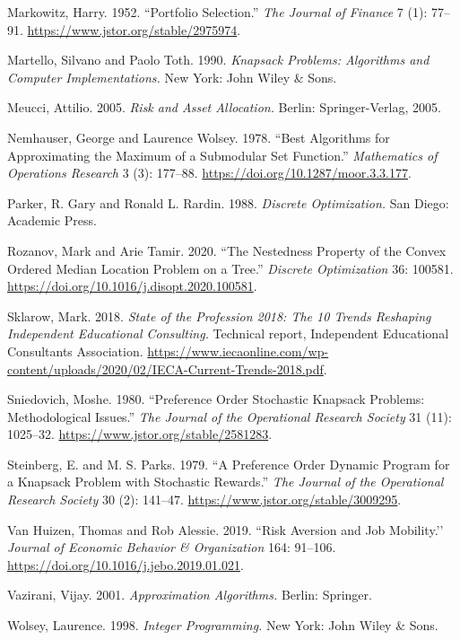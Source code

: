 \documentclass[11pt]{article} %
\theoremstyle{definition}
\theoremstyle{definition}
\begin{document}
Markowitz, Harry. 1952. ``Portfolio Selection.'' \emph{The Journal of Finance} 7 (1): 77--91. \url{https://www.jstor.org/stable/2975974}.

Martello, Silvano and Paolo Toth. 1990. \emph{Knapsack Problems: Algorithms and Computer Implementations.} New York: John Wiley \& Sons. 

Meucci, Attilio. 2005. \emph{Risk and Asset Allocation.} Berlin: Springer-Verlag, 2005. 

Nemhauser, George and Laurence Wolsey. 1978. ``Best Algorithms for Approximating the Maximum of a Submodular Set Function.'' \emph{Mathematics of Operations Research} 3 (3): 177--88. \url{https://doi.org/10.1287/moor.3.3.177}.


Parker, R. Gary and Ronald L. Rardin. 1988. \emph{Discrete Optimization.} San Diego: Academic Press.

Rozanov, Mark and Arie Tamir. 2020. ``The Nestedness Property of the Convex Ordered Median Location Problem on a Tree.'' \emph{Discrete Optimization} 36: 100581. \url{https://doi.org/10.1016/j.disopt.2020.100581}.

Sklarow, Mark. 2018. \emph{State of the Profession 2018: The 10 Trends Reshaping Independent Educational Consulting.} Technical report, Independent Educational Consultants Association. \url{https://www.iecaonline.com/wp-content/uploads/2020/02/IECA-Current-Trends-2018.pdf}.

Sniedovich, Moshe. 1980. ``Preference Order Stochastic Knapsack Problems: Methodological Issues.'' \emph{The Journal of the Operational Research Society} 31 (11): 1025--32. \url{https://www.jstor.org/stable/2581283}. 

Steinberg, E. and M. S. Parks. 1979. ``A Preference Order Dynamic Program for a Knapsack Problem with Stochastic Rewards.'' \emph{The Journal of the Operational Research Society} 30 (2): 141--47. \url{https://www.jstor.org/stable/3009295}. 


Van Huizen, Thomas and Rob Alessie. 2019. ``Risk Aversion and Job Mobility.’’ \emph{Journal of Economic Behavior \& Organization} 164: 91--106. \url{https://doi.org/10.1016/j.jebo.2019.01.021}.

Vazirani, Vijay. 2001. \emph{Approximation Algorithms.} Berlin: Springer. 

Wolsey, Laurence. 1998. \emph{Integer Programming.} New York: John Wiley \& Sons. 
\end{document}
